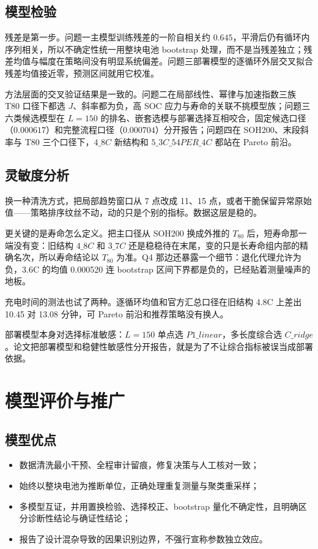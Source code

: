 \documentclass[withoutpreface,bwprint]{cumcmthesis}
\begin{document}
\subsection{模型检验}
残差是第一步。问题一主模型训练残差的一阶自相关约 $0.645$，平滑后仍有循环内序列相关，所以不确定性统一用整块电池 bootstrap 处理，而不是当残差独立；残差均值与幅度在策略间没有明显系统偏差。问题三部署模型的逐循环外层交叉拟合残差均值接近零，预测区间就用它校准。

方法层面的交叉验证结果是一致的。问题二在局部线性、幂律与加速指数三族 T80 口径下都选 $J$、斜率都为负，高 SOC 应力与寿命的关联不挑模型族；问题三六类候选模型在 $L=150$ 的排名、嵌套选模与部署选择互相咬合，固定候选口径（$0.000617$）和完整流程口径（$0.000704$）分开报告；问题四在 SOH200、末段斜率与 T80 三个口径下，$4\_8C$ 新结构和 $5\_3C\_54PER\_4C$ 都站在 Pareto 前沿。

\subsection{灵敏度分析}
换一种清洗方式，把局部趋势窗口从 7 点改成 11、15 点，或者干脆保留异常原始值——策略排序纹丝不动，动的只是个别的指标。数据这层是稳的。

更关键的是寿命怎么定义。把主口径从 SOH200 换成外推的 $T_{80}$ 后，短寿命那一端没有变：旧结构 $4\_8C$ 和 $3\_7C$ 还是稳稳待在末尾，变的只是长寿命组内部的精确名次，所以寿命结论以 $T_{80}$ 为准。Q4 那边还暴露一个细节：退化代理允许为负，3.6C 的均值 0.000520 连 bootstrap 区间下界都是负的，已经贴着测量噪声的地板。

充电时间的测法也试了两种。逐循环均值和官方汇总口径在旧结构 4.8C 上差出 10.45 对 13.08 分钟，可 Pareto 前沿和推荐策略没有换人。

部署模型本身对选择标准敏感：$L=150$ 单点选 $P1\_linear$，多长度综合选 $C\_ridge$。论文把部署模型和稳健性敏感性分开报告，就是为了不让综合指标被误当成部署依据。

\section{模型评价与推广}
\subsection{模型优点}
\begin{itemize}
\item 数据清洗最小干预、全程审计留痕，修复决策与人工核对一致；
\item 始终以整块电池为推断单位，正确处理重复测量与聚类重采样；
\item 多模型互证，并用置换检验、选择校正、bootstrap 量化不确定性，且明确区分诊断性结论与确证性结论；
\item 报告了设计混杂导致的因果识别边界，不强行宣称参数独立效应。
\end{itemize}
\end{document}
